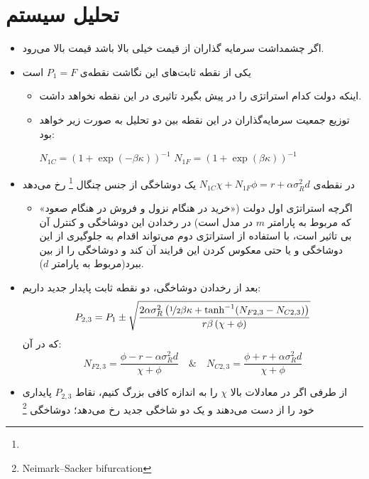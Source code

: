 \documentclass[13pt,onecolumn,a4paper]{article}
\begin{document}
	\section{تحلیل سیستم}
	\begin{itemize}
		\item 
		اگر چشمداشت سرمایه گذاران از قیمت خیلی بالا باشد قیمت بالا می‌رود.
		\item
		یکی از نقطه ثابت‌های این نگاشت نقطه‌ی $P_1=F$ است
		\begin{itemize}
			\item اینکه دولت کدام استراتژی را در پیش بگیرد تاثیری در این نقطه نخواهد داشت.
			
			\item توزیع جمعیت سرمایه‌گذاران در این نقطه بین دو تحلیل به صورت زیر خواهد بود:
			
			 $N_{1C}=\left(1+\exp(-\beta\kappa)\right)^{-1}$ \qquad $N_{1F}=\left(1+\exp(\beta\kappa)\right)^{-1}$

		\end{itemize}
	\item 
	در نقطه‌ی 
	$N_{1C}\chi+N_{1F}\phi=r+\alpha\sigma_R^2d$ 
	یک دوشاخگی از جنس چنگال \footnote{} رخ می‌دهد
	
			\begin{itemize}
				\item 
				اگرچه استراتژی اول دولت («خرید در هنگام نزول و فروش در هنگام صعود» که مربوط به پارامتر $m$ در مدل است) در رخدادن این دوشاخگی و کنترل آن بی تاثیر است، با استفاده از استراتژی دوم می‌تواند اقدام به جلوگیری از این دوشاخگی و یا حتی معکوس کردن این فرایند آن کند و دوشاخگی را از  بین ببرد(مربوط به پارامتر $d$).
				
			\end{itemize}
		\item 
		بعد از رخدادن دوشاخگی، دو نقطه ثابت پایدار جدید داریم:
	$$P_{2,3}=P_1\pm\sqrt{\frac{2\alpha\sigma_R^2\left(\nicefrac{1}{2}\beta\kappa+\tanh[-1](N_{F2,3}-N_{C2,3})\right)}{r\beta\left(\chi+\phi\right)}}$$
		که در آن:
		$$ N_{F2,3}=\frac{\phi -r- \alpha\sigma_R^2d}{\chi + \phi} \quad\&\quad N_{C2,3}=\frac{\phi +r+ \alpha\sigma_R^2d}{\chi + \phi}$$
		
\item 
از طرفی اگر در معادلات بالا $\chi$ را به اندازه کافی بزرگ کنیم، نقاط $P_{2,3}$ پایداری خود را از دست می‌دهند و یک دو شاخگی جدید رخ می‌دهد؛ دوشاخگی \footnote{Neimark–Sacker bifurcation}	



\end{itemize}
\end{document}
